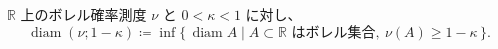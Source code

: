 $\mathbb{R}$ 上のボレル確率測度 $\nu$ と $0 < \kappa < 1$ に対し、
\[
  \operatorname{diam}(\nu; 1 - \kappa) \coloneqq
  \inf\{\, \operatorname{diam} A \mid A \subset \mathbb{R} \text{ はボレル集合},\ \nu(A) \ge 1 - \kappa \,\}.
\]
